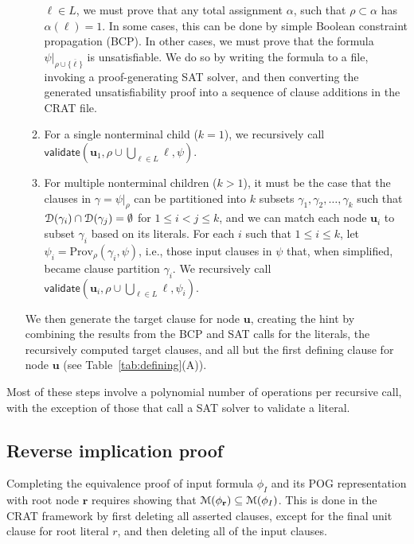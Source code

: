 \documentclass[letterpaper,USenglish,cleveref, autoref, thm-restate]{lipics-v2021}
\newcommand{\obar}[1]{\overline{#1}}
\newcommand{\lit}{\ell}
\newcommand{\dependencyset}{{\cal D}}
\newcommand{\imply}{\Rightarrow}
\newcommand{\passign}{\rho}
\newcommand{\modelset}{{\cal M}}
\newcommand{\validate}{\textsf{validate}}
\newcommand{\prov}{\textrm{Prov}}
\newcommand{\inputformula}{\phi_I}
\newcommand{\makenode}[1]{\mathbf{#1}}
\newcommand{\nodeu}{\makenode{u}}
\newcommand{\noder}{\makenode{r}}
\newcommand{\simplify}[2]{#1|_{#2}}
\begin{document}
\begin{enumerate}
\begin{enumerate}
  $\lit \in L$, we must prove that any total assignment $\alpha$, such that
  $\passign \subset \alpha$ has $\alpha(\lit) = 1$.  In some
  cases, this can be done by simple Boolean constraint propagation (BCP).
  In other cases, we must prove that the formula
  $\simplify{\psi}{\passign \cup \{\obar{\lit}\}}$ is unsatisfiable.  We
  do so by writing the formula to a file, invoking a proof-generating
  SAT solver, and then converting the generated unsatisfiability proof
  into a sequence of clause additions in the CRAT file.
\item For a single nonterminal child ($k = 1$), we recursively call
  $\validate \left(\nodeu_1, \passign \cup \bigcup_{\lit \in L} \lit, \psi\right)$.
\item For multiple nonterminal children ($k > 1$),
  it must be the case that the clauses in
  $\gamma = \simplify{\psi}{\passign}$ can be partitioned into $k$ subsets
  $\gamma_1, \gamma_2, \ldots, \gamma_k$ such that $\dependencyset(\gamma_i)
  \cap \dependencyset(\gamma_j) = \emptyset$ for $1 \leq i < j \leq k$,
  and we can match each node $\nodeu_i$ to subset $\gamma_i$ based on its
  literals.
  For each $i$ such that $1 \leq i \leq k$, let $\psi_i = \prov_{\passign}(\gamma_i, \psi)$, i.e., those input clauses in $\psi$ that, when simplified, became clause partition $\gamma_i$.
  We recursively call
  $\validate \left(\nodeu_i, \passign \cup \bigcup_{\lit \in L} \lit, \psi_i\right)$.
\end{enumerate}
  We then generate the target clause for node $\nodeu$,
creating the hint by combining the results from the BCP and SAT calls for
  the literals, the recursively computed target clauses, and all but
  the first defining clause for node $\nodeu$
(see Table~\ref{tab:defining}(A)).
\end{enumerate}
Most of these steps involve a polynomial number of
operations per recursive call, with the exception of those that call
a SAT solver to validate a literal.

\subsection{Reverse implication proof}

Completing the equivalence proof of input formula $\inputformula$ and its POG
representation with root node $\noder$ requires showing that
$\modelset(\phi_\noder) \subseteq \modelset(\inputformula)$.  This is done in the
CRAT framework by first deleting all asserted clauses, except for the
final unit clause for root literal $r$, and then deleting all of the
input clauses.
\end{document}
